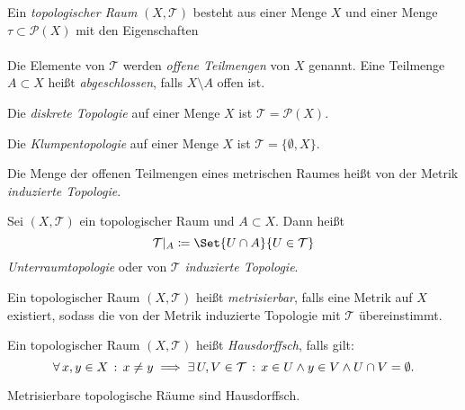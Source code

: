 \documentclass{cheat-sheet}
\newcommand{\Tau}{\mathcal{T}} %
\newcommand{\Pow}{\mathcal{P}} %
\begin{document}
\begin{defn}
  Ein \emph{topologischer Raum} $(X, \Tau)$ besteht aus einer Menge $X$ und einer Menge $\tau \subset \Pow(X)$ mit den Eigenschaften \\
  \inlineitem{$\emptyset \in \Tau$,} \quad
  \inlineitem{$\fa{U, V \in \Tau} U \cap V \in \Tau$,} \quad
  \inlineitem{$\fa{S \subset \Tau} \bigcap_{\mathclap{U \in S}} U \in \Tau$} \\
  Die Elemente von $\Tau$ werden \emph{offene Teilmengen} von $X$ genannt. Eine Teilmenge $A \subset X$ heißt \emph{abgeschlossen}, falls $X \setminus A$ offen ist.
\end{defn}

\begin{bsp}
  Die \emph{diskrete Topologie} auf einer Menge $X$ ist $\Tau = \Pow(X)$.
\end{bsp}

\begin{bsp}
  Die \emph{Klumpentopologie} auf einer Menge $X$ ist $\Tau = \{ \emptyset, X \}$.
\end{bsp}

\begin{defn}
  Die Menge der offenen Teilmengen eines metrischen Raumes heißt von der Metrik \emph{induzierte Topologie}.
\end{defn}

\begin{defn}
  Sei $(X, \Tau)$ ein topologischer Raum und $A \subset X$. Dann heißt
  \[ \Tau|_A \coloneqq \Set{U \cap A}{U \in \Tau} \]
  \emph{Unterraumtopologie} oder von $\Tau$ \emph{induzierte Topologie}.
\end{defn}


\begin{defn}
  Ein topologischer Raum $(X, \Tau)$ heißt \emph{metrisierbar}, falls eine Metrik auf $X$ existiert, sodass die von der Metrik induzierte Topologie mit $\Tau$ übereinstimmt.
\end{defn}

\begin{defn}
  Ein topologischer Raum $(X, \Tau)$ heißt \emph{Hausdorffsch}, falls gilt:
  \[ \fa{x,y \in X} x \not= y \implies \ex{U,V \in \Tau} x \in U \wedge y \in V \wedge U \cap V = \emptyset. \]
\end{defn}

\begin{prop}
  Metrisierbare topologische Räume sind Hausdorffsch.
\end{prop}
\end{document}
